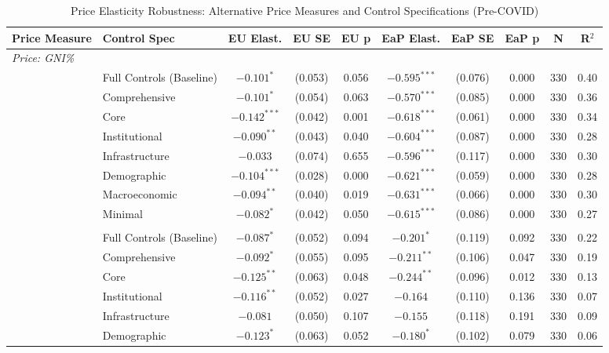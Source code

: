 \begin{table}[p]
\centering
\caption{Price Elasticity Robustness: Alternative Price Measures and Control Specifications (Pre-COVID)}
\label{tab:price_robustness}
\begin{minipage}{\textwidth}
\begin{adjustbox}{width=\textwidth}
\small
\begin{tabular}{llcccccccc}
\toprule
Price Measure & Control Spec & EU Elast. & EU SE & EU p & EaP Elast. & EaP SE & EaP p & N & R$^2$ \\
\midrule
\multicolumn{10}{l}{\textit{Price: GNI\%}} \\
 & Full Controls (Baseline) & $-0.101^{*}$ & (0.053) & 0.056 & $-0.595^{***}$ & (0.076) & 0.000 & 330 & 0.40 \\
 & Comprehensive & $-0.101^{*}$ & (0.054) & 0.063 & $-0.570^{***}$ & (0.085) & 0.000 & 330 & 0.36 \\
 & Core & $-0.142^{***}$ & (0.042) & 0.001 & $-0.618^{***}$ & (0.061) & 0.000 & 330 & 0.34 \\
 & Institutional & $-0.090^{**}$ & (0.043) & 0.040 & $-0.604^{***}$ & (0.087) & 0.000 & 330 & 0.28 \\
 & Infrastructure & $-0.033$ & (0.074) & 0.655 & $-0.596^{***}$ & (0.117) & 0.000 & 330 & 0.30 \\
 & Demographic & $-0.104^{***}$ & (0.028) & 0.000 & $-0.621^{***}$ & (0.059) & 0.000 & 330 & 0.28 \\
 & Macroeconomic & $-0.094^{**}$ & (0.040) & 0.019 & $-0.631^{***}$ & (0.066) & 0.000 & 330 & 0.30 \\
 & Minimal & $-0.082^{*}$ & (0.042) & 0.050 & $-0.615^{***}$ & (0.086) & 0.000 & 330 & 0.27 \\
\addlinespace
\multicolumn{10}{l}{\textit{Price: PPP}} \\
 & Full Controls (Baseline) & $-0.087^{*}$ & (0.052) & 0.094 & $-0.201^{*}$ & (0.119) & 0.092 & 330 & 0.22 \\
 & Comprehensive & $-0.092^{*}$ & (0.055) & 0.095 & $-0.211^{**}$ & (0.106) & 0.047 & 330 & 0.19 \\
 & Core & $-0.125^{**}$ & (0.063) & 0.048 & $-0.244^{**}$ & (0.096) & 0.012 & 330 & 0.13 \\
 & Institutional & $-0.116^{**}$ & (0.052) & 0.027 & $-0.164$ & (0.110) & 0.136 & 330 & 0.07 \\
 & Infrastructure & $-0.081$ & (0.050) & 0.107 & $-0.155$ & (0.118) & 0.191 & 330 & 0.09 \\
 & Demographic & $-0.123^{*}$ & (0.063) & 0.052 & $-0.180^{*}$ & (0.102) & 0.079 & 330 & 0.06 \\

\end{tabular}
\end{adjustbox}
\end{minipage}
\end{table}
